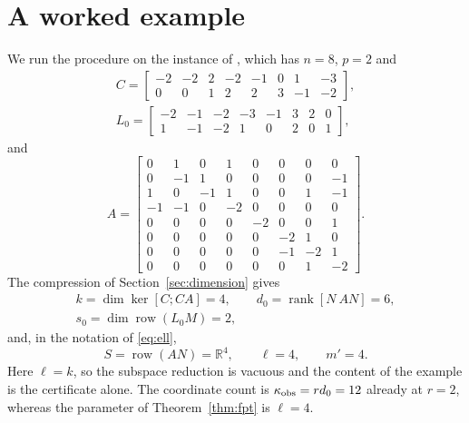 \documentclass[journal]{IEEEtran}
\theoremstyle{plainn}
\theoremstyle{remark}
\begin{document}
\section{A worked example}\label{app:example}

We run the procedure on the instance of \cite[Sec.~VII]{fer26b}, which has $n=8$, $p=2$ and
\begin{equation*}
\begin{gathered}
C=\begin{bmatrix}-2&-2&2&-2&-1&0&1&-3\\ 0&0&1&2&2&3&-1&-2\end{bmatrix},\\
L_0=\begin{bmatrix}-2&-1&-2&-3&-1&3&2&0\\ 1&-1&-2&1&0&2&0&1\end{bmatrix},
\end{gathered}
\end{equation*}
and
\begin{equation*}
A=\begin{bmatrix}
0&1&0&1&0&0&0&0\\
0&-1&1&0&0&0&0&-1\\
1&0&-1&1&0&0&1&-1\\
-1&-1&0&-2&0&0&0&0\\
0&0&0&0&-2&0&0&1\\
0&0&0&0&0&-2&1&0\\
0&0&0&0&0&-1&-2&1\\
0&0&0&0&0&0&1&-2
\end{bmatrix}.
\end{equation*}
The compression of Section~\ref{sec:dimension} gives
\begin{equation*}
\begin{gathered}
k=\dim\ker[C;CA]=4,\qquad d_0=\operatorname{rank}[N\ AN]=6,\\
s_0=\dim\operatorname{row}(L_0M)=2,
\end{gathered}
\end{equation*}
and, in the notation of \eqref{eq:ell},
\begin{equation*}
S=\operatorname{row}(AN)=\mathbb R^4,\qquad \ell=4,\qquad m'=4 .
\end{equation*}
Here $\ell=k$, so the subspace reduction is vacuous and the content of the example is the
certificate alone. The coordinate count is $\kappa_{\rm obs}=rd_0=12$ already at $r=2$, whereas
the parameter of Theorem~\ref{thm:fpt} is $\ell=4$.
\end{document}
